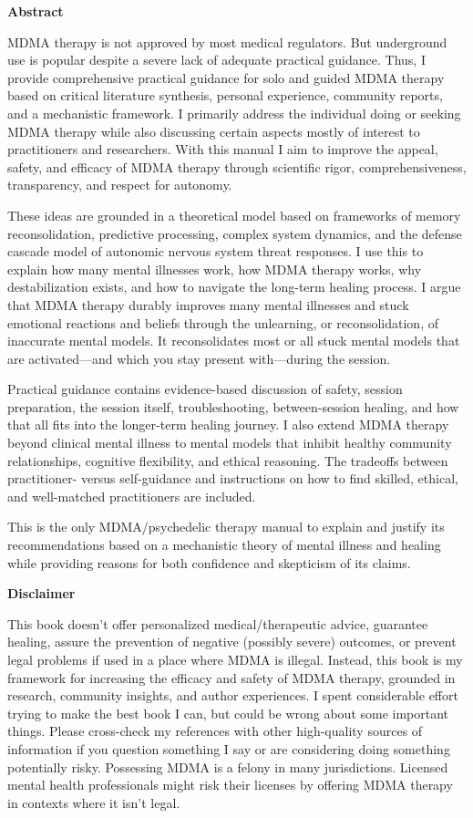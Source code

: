 \documentclass[11pt,oneside]{book}
\newcommand{\frontsection}[1]{%
  \par\vspace{2\baselineskip}%
  {\centering\sffamily\bfseries\large #1\par}%
  \nopagebreak\vspace{\baselineskip}%
}
\begin{document}
\newpage

\frontsection{Abstract}
MDMA therapy is not approved by most medical regulators. But underground use is popular despite a severe lack of adequate practical guidance. Thus, I provide comprehensive practical guidance for solo and guided MDMA therapy based on critical literature synthesis, personal experience, community reports, and a mechanistic framework. I primarily address the individual doing or seeking MDMA therapy while also discussing certain aspects mostly of interest to practitioners and researchers. With this manual I aim to improve the appeal, safety, and efficacy of MDMA therapy through scientific rigor, comprehensiveness, transparency, and respect for autonomy.

These ideas are grounded in a theoretical model based on frameworks of memory reconsolidation, predictive processing, complex system dynamics, and the defense cascade model of autonomic nervous system threat responses. I use this to explain how many mental illnesses work, how MDMA therapy works, why destabilization exists, and how to navigate the long-term healing process. I argue that MDMA therapy durably improves many mental illnesses and stuck emotional reactions and beliefs through the unlearning, or reconsolidation, of inaccurate mental models. It reconsolidates most or all stuck mental models that are activated---and which you stay present with---during the session.

Practical guidance contains evidence-based discussion of safety, session preparation, the session itself, troubleshooting, between-session healing, and how that all fits into the longer-term healing journey. I also extend MDMA therapy beyond clinical mental illness to mental models that inhibit healthy community relationships, cognitive flexibility, and ethical reasoning. The tradeoffs between practitioner- versus self-guidance and instructions on how to find skilled, ethical, and well-matched practitioners are included.

This is the only MDMA/psychedelic therapy manual to explain and justify its recommendations based on a mechanistic theory of mental illness and healing while providing reasons for both confidence and skepticism of its claims.

\clearpage

\newpage

\frontsection{Disclaimer}
This book doesn't offer personalized medical/therapeutic advice, guarantee healing, assure the prevention of negative (possibly severe) outcomes, or prevent legal problems if used in a place where MDMA is illegal. Instead, this book is my framework for increasing the efficacy and safety of MDMA therapy, grounded in research, community insights, and author experiences. I spent considerable effort trying to make the best book I can, but could be wrong about some important things. Please cross-check my references with other high-quality sources of information if you question something I say or are considering doing something potentially risky. Possessing MDMA is a felony in many jurisdictions. Licensed mental health professionals might risk their licenses by offering MDMA therapy in contexts where it isn't legal.
\end{document}
